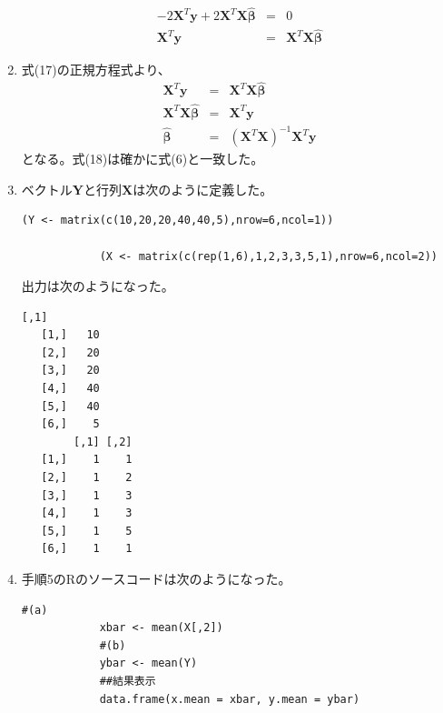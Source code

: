 \documentclass[12pt]{jarticle}
\begin{document}
\begin{enumerate}
\begin{eqnarray}
              -2\bm X^T\bm y+2\bm X^T\bm X\hat{\bm \beta}&=&0 \nonumber \\
              \bm X^T\bm y &=&\bm X^T\bm X\hat{\bm \beta}
          \end{eqnarray}
    \item 式(17)の正規方程式より、
          \begin{eqnarray}
              \bm X^T\bm y &=&\bm X^T\bm X\hat{\bm \beta} \nonumber \\
              \bm X^T\bm X\hat{\bm \beta} &=& \bm X^T\bm y \nonumber \\
              \hat{\bm \beta} &=&  (\bm X^T\bm X)^{-1}\bm X^T\bm y
          \end{eqnarray}
          となる。式(18)は確かに式(6)と一致した。

    \item ベクトル$\bm Y$と行列$\bm X$は次のように定義した。
          \begin{lstlisting}[style = lstR]
            (Y <- matrix(c(10,20,20,40,40,5),nrow=6,ncol=1))

            (X <- matrix(c(rep(1,6),1,2,3,3,5,1),nrow=6,ncol=2))
\end{lstlisting}
          出力は次のようになった。
          \begin{lstlisting}[style=log]
        [,1]
   [1,]   10
   [2,]   20
   [3,]   20
   [4,]   40
   [5,]   40
   [6,]    5
        [,1] [,2]
   [1,]    1    1
   [2,]    1    2
   [3,]    1    3
   [4,]    1    3
   [5,]    1    5
   [6,]    1    1
\end{lstlisting}

    \item 手順5のRのソースコードは次のようになった。
          \begin{lstlisting}[style = lstR]
            #(a)
            xbar <- mean(X[,2])
            #(b)
            ybar <- mean(Y)
            ##結果表示
            data.frame(x.mean = xbar, y.mean = ybar)
            

\end{lstlisting}
\end{enumerate}
\end{document}
